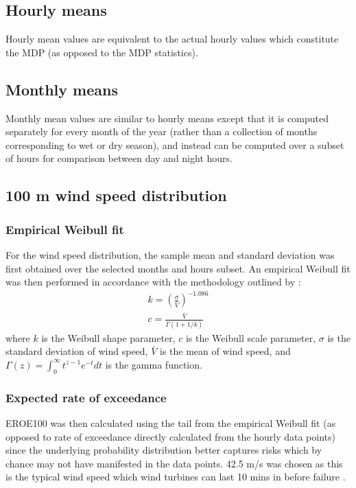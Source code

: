 \subsection{Hourly means}

Hourly mean values are equivalent to the actual hourly values which constitute the \ac{MDP} (as opposed to the \ac{MDP} statistics).

\subsection{Monthly means}

Monthly mean values are similar to hourly means except that it is computed separately for every month of the year (rather than a collection of months corresponding to wet or dry season), and instead can be computed over a subset of hours for comparison between day and night hours.

\subsection{100 m wind speed distribution}
\label{ssec:method_wsd}

\subsubsection{Empirical Weibull fit}

For the wind speed distribution, the sample mean and standard deviation was first obtained over the selected months and hours subset. An empirical Weibull fit was then performed in accordance with the methodology outlined by \citep{justus1977}:
\begin{eqnarray}
	k = \left( \frac{\sigma}{\bar{V}} \right)^{-1.086} \\ 
	c = \frac{\bar{V}}{\Gamma (1 + 1/k)}
\end{eqnarray}
where $k$ is the Weibull shape parameter, $c$ is the Weibull scale parameter, $\sigma$ is the standard deviation of wind speed, $\bar{V}$ is the mean of wind speed, and $\Gamma (z) = \int_0^\infty t^{z-1} e^{-t} dt$ is the gamma function.

\subsubsection{Expected rate of exceedance}

\ac{EROE100} was then calculated using the tail from the empirical Weibull fit (as opposed to rate of exceedance directly calculated from the hourly data points) since the underlying probability distribution better captures risks which by chance may not have manifested in the data points. 42.5 m/s was chosen as this is the typical wind speed which wind turbines can last 10 mins in before failure \citep{chen2015, chen2016, ge_web}.

